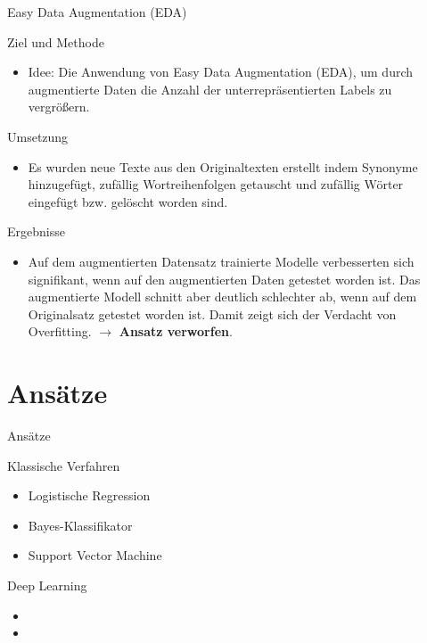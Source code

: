 \documentclass[aspectratio=169]{beamer} %
\begin{document}
\begin{frame}{Easy Data Augmentation (EDA)}
    \begin{block}{Ziel und Methode}
        \begin{itemize}
            \item Idee: Die Anwendung von Easy Data Augmentation (EDA), um durch augmentierte Daten die Anzahl der unterrepräsentierten Labels zu vergrößern.
        \end{itemize}
    \end{block}

    \begin{block}{Umsetzung}
        \begin{itemize}
            \item Es wurden neue Texte aus den Originaltexten erstellt indem Synonyme hinzugefügt, zufällig Wortreihenfolgen getauscht und zufällig Wörter eingefügt bzw. gelöscht worden sind.
        \end{itemize}
    \end{block}

    \begin{alertblock}{Ergebnisse}
        \begin{itemize}
            \item Auf dem augmentierten Datensatz trainierte Modelle verbesserten sich signifikant, wenn auf den augmentierten Daten getestet worden ist. Das augmentierte Modell schnitt aber deutlich schlechter ab, wenn auf dem Originalsatz getestet worden ist. Damit zeigt sich der Verdacht von Overfitting. $\to$ \textbf{Ansatz verworfen}.
        \end{itemize}
    \end{alertblock}
\end{frame}

\section{Ansätze}

\begin{frame}{Ansätze}
    \begin{block}{Klassische Verfahren}
        \begin{itemize}
            \item Logistische Regression
            \item Bayes-Klassifikator
            \item Support Vector Machine
        \end{itemize}
    \end{block}
    \begin{block}{Deep Learning}
        \begin{itemize}
            \item {}
            \item {}
        \end{itemize}
    \end{block}
\end{frame}
\end{document}
